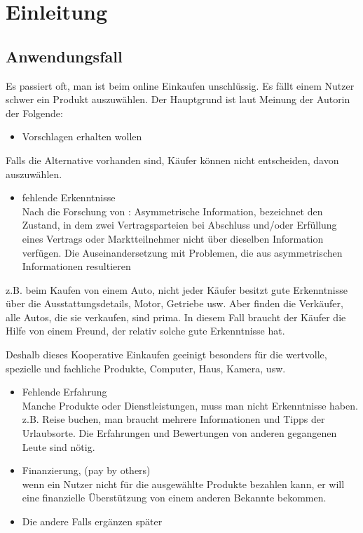 
\chapter{Einleitung}


\section{Anwendungsfall}

Es passiert oft, man ist beim online Einkaufen unschlüssig. Es fällt einem Nutzer schwer ein Produkt auszuwählen. Der Hauptgrund ist laut Meinung der Autorin der Folgende:

\begin{itemize}
\item Vorschlagen erhalten wollen
\end{itemize}

Falls die Alternative vorhanden sind, Käufer können nicht entscheiden, davon auszuwählen.

\begin{itemize}
\item fehlende Erkenntnisse\\
Nach die Forschung von \textcite{akerlof:lemons}: \glqq Asymmetrische Information, bezeichnet den Zustand, in dem zwei Vertragsparteien bei Abschluss und/oder Erfüllung eines Vertrags oder Marktteilnehmer nicht über dieselben Information verfügen. Die Auseinandersetzung mit Problemen, die aus asymmetrischen Informationen resultieren\grqq
\end{itemize}

z.B. beim Kaufen von einem Auto, nicht jeder Käufer besitzt gute Erkenntnisse über die Ausstattungsdetails, Motor, Getriebe usw. Aber finden die Verkäufer, alle Autos, die sie verkaufen, sind prima. In diesem Fall braucht der Käufer die Hilfe von einem Freund, der relativ solche gute Erkenntnisse hat.

Deshalb dieses Kooperative Einkaufen geeinigt besonders für die wertvolle, spezielle und fachliche Produkte, Computer, Haus, Kamera, usw.

\begin{itemize}
\item Fehlende Erfahrung\\
Manche Produkte oder Dienstleistungen, muss man nicht Erkenntnisse haben. z.B. Reise buchen, man braucht mehrere Informationen und Tipps der Urlaubsorte. Die Erfahrungen und Bewertungen von anderen gegangenen Leute sind nötig.
\item Finanzierung, (pay by others)\\
wenn ein Nutzer nicht für die ausgewählte Produkte bezahlen kann, er will eine finanzielle Überstützung von einem anderen Bekannte bekommen.
\item Die andere Falls ergänzen später
\end{itemize}


